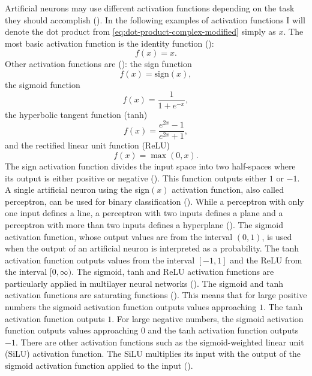 \documentclass{BachelorBUI}
\begin{document}
                Artificial neurons may use different activation functions depending on the task they should accomplish (\cite{Aggarwal:2018}). In the following examples of activation functions I will denote the dot product from \autoref{eq:dot-product-complex-modified} simply as $x$. The most basic activation function is the identity function (\cite{Aggarwal:2018}):
                \begin{equation}
                    f(x)=x.
                    \label{eq:identity-function}
                \end{equation}
                Other activation functions are (\cite{Aggarwal:2018}): the sign function
                \begin{equation}
                    f(x)=\text{sign}(x),
                    \label{eq:sign-function}
                \end{equation}
                the sigmoid function
                \begin{equation}
                    f(x) = \frac{1}{1 + e^{-x}},
                    \label{eq:sigmoid-function}
                \end{equation}
                the hyperbolic tangent function (tanh)
                \begin{equation}
                     f(x) = \frac{e^{2x}-1}{e^{2x}+1},
                    \label{eq:tanh-function}
                \end{equation}
                and the rectified linear unit function (ReLU)
                \begin{equation}
                    f(x) = \max(0, x).
                    \label{eq:relu-function}
                \end{equation}
                The sign activation function divides the input space into two half-spaces where its output is either positive or negative (\cite{Alpaydin:2014}). This function outputs either $1$ or $-1$. A single artificial neuron using the sign$(x)$ activation function, also called perceptron, can be used for binary classification (\cite{Aggarwal:2018}). While a perceptron with only one input defines a line, a perceptron with two inputs defines a plane and a perceptron with more than two inputs defines a hyperplane (\cite{Alpaydin:2014}). The sigmoid activation function, whose output values are from the interval $(0,1)$, is used when the output of an artificial neuron is interpreted as a probability. The tanh activation function outputs values from the interval $[-1,1]$ and the ReLU from the interval $[0, \infty)$. The sigmoid, tanh and ReLU activation functions are particularly applied in multilayer neural networks (\cite{Alpaydin:2014}). The sigmoid and tanh activation functions are saturating functions (\cite{Murphy:2022}). This means that for large positive numbers the sigmoid activation function outputs values approaching $1$. The tanh activation function outputs $1$. For large negative numbers, the sigmoid activation function outputs values approaching $0$ and the tanh activation function outputs $-1$. There are other activation functions such as the sigmoid-weighted linear unit (SiLU) activation function. The SiLU multiplies its input with the output of the sigmoid activation function applied to the input (\cite{Elfwing:2017}).
\end{document}
